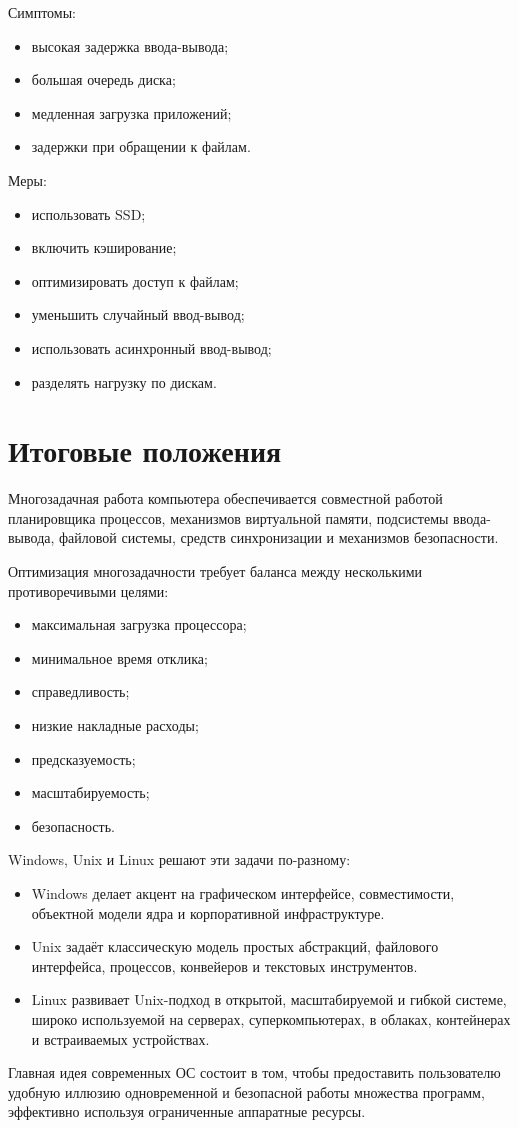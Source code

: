 \documentclass[12pt,a4paper]{article}
\begin{document}
Симптомы:

\begin{itemize}
    \item высокая задержка ввода-вывода;
    \item большая очередь диска;
    \item медленная загрузка приложений;
    \item задержки при обращении к файлам.
\end{itemize}

Меры:

\begin{itemize}
    \item использовать SSD;
    \item включить кэширование;
    \item оптимизировать доступ к файлам;
    \item уменьшить случайный ввод-вывод;
    \item использовать асинхронный ввод-вывод;
    \item разделять нагрузку по дискам.
\end{itemize}

\section{Итоговые положения}

Многозадачная работа компьютера обеспечивается совместной работой планировщика процессов, механизмов виртуальной памяти, подсистемы ввода-вывода, файловой системы, средств синхронизации и механизмов безопасности.

Оптимизация многозадачности требует баланса между несколькими противоречивыми целями:

\begin{itemize}
    \item максимальная загрузка процессора;
    \item минимальное время отклика;
    \item справедливость;
    \item низкие накладные расходы;
    \item предсказуемость;
    \item масштабируемость;
    \item безопасность.
\end{itemize}

Windows, Unix и Linux решают эти задачи по-разному:

\begin{itemize}
    \item Windows делает акцент на графическом интерфейсе, совместимости, объектной модели ядра и корпоративной инфраструктуре.
    \item Unix задаёт классическую модель простых абстракций, файлового интерфейса, процессов, конвейеров и текстовых инструментов.
    \item Linux развивает Unix-подход в открытой, масштабируемой и гибкой системе, широко используемой на серверах, суперкомпьютерах, в облаках, контейнерах и встраиваемых устройствах.
\end{itemize}

Главная идея современных ОС состоит в том, чтобы предоставить пользователю удобную иллюзию одновременной и безопасной работы множества программ, эффективно используя ограниченные аппаратные ресурсы.
\end{document}
